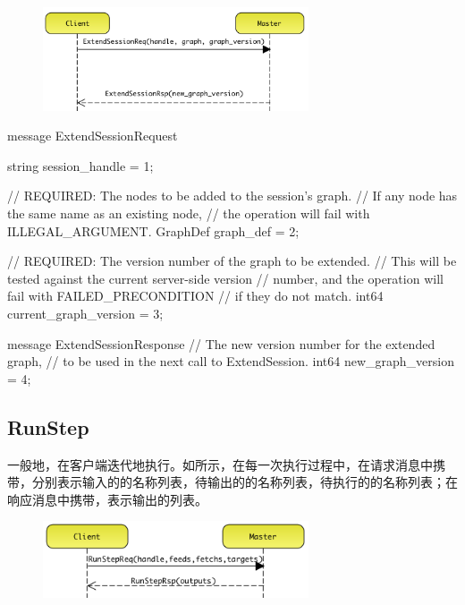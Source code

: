 \begin{content}
\begin{content}
\begin{figure}[H]
\centering
\includegraphics[width=0.7\textwidth]{figures/dist-ms-extend-sess-req.png}
\caption{}
 \label{fig:dist-ms-extend-sess-req}
\end{figure}

\begin{leftbar}
\begin{c++}
message ExtendSessionRequest {
  string session_handle = 1;

  // REQUIRED: The nodes to be added to the session's graph. 
  // If any node has the same name as an existing node, 
  // the operation will fail with ILLEGAL\_ARGUMENT.
  GraphDef graph_def = 2;

  // REQUIRED: The version number of the graph to be extended. 
  // This will be tested against the current server-side version 
  // number, and the operation will fail with FAILED\_PRECONDITION 
  // if they do not match.
  int64 current_graph_version = 3;
}

message ExtendSessionResponse {
  // The new version number for the extended graph, 
  // to be used in the next call to ExtendSession.
  int64 new_graph_version = 4;
}
\end{c++}
\end{leftbar}

\subsection{RunStep}

一般地，在客户端迭代地执行。如所示，在每一次执行过程中，在请求消息中携带，分别表示输入的的名称列表，待输出的的名称列表，待执行的的名称列表；在响应消息中携带，表示输出的列表。

\begin{figure}[H]
\centering
\includegraphics[width=0.7\textwidth]{figures/dist-ms-run-step-req.png}
\caption{}
 \label{fig:dist-ms-run-step-req}
\end{figure}


\end{content}
\end{content}
